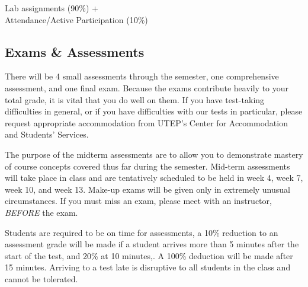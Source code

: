 \documentclass[12pt]{scrartcl}
\begin{document}
\begin{tcolorbox}[colback=blue!5,colframe=blue!75!black,title=Lab Grade]
\begin{center}

Lab assignments (90\%) + \\
Attendance/Active Participation (10\%)
\end{center}

\end{tcolorbox}

\subsection{Exams \& Assessments}
There will be 4 small assessments through the semester, one comprehensive assessment, and one final exam. 
Because the exams contribute heavily to your total grade, it is vital that you do well on them. 
If you have test-taking difficulties in general, or if you have difficulties with our tests in particular, please request appropriate accommodation from UTEP’s Center for Accommodation and Students’ Services.

The purpose of the midterm assessments are to allow you to demonstrate mastery of course concepts covered thus far during the semester. 
Mid-term assessments will take place 
in class 
and are tentatively scheduled to be held in week 4, week 7, week 10, and week 13. 
Make-up exams will be given only in extremely unusual circumstances. 
If you must miss an exam, please meet with an instructor, \textit{BEFORE} the exam. 

{\color{red}Students are required to be on time for assessments, a 10\% reduction to an assessment grade will be made if a student arrives more than 5 minutes after the start of the test, and 20\% at 10 minutes,.
A 100\% deduction will be made after 15 minutes.}
Arriving to a test late is disruptive to all students in the class and cannot be tolerated. 
 
\end{document}
